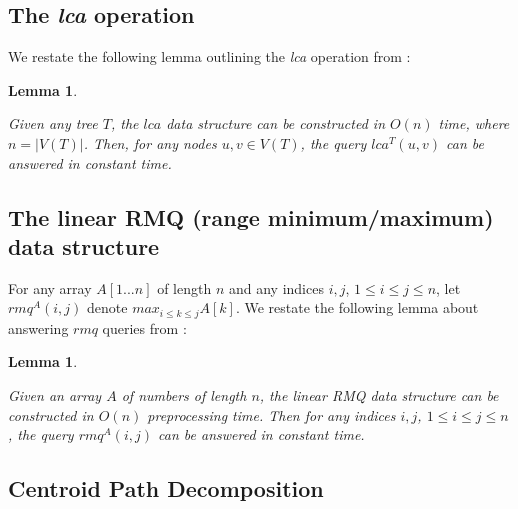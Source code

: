 \documentclass{article}
\newtheorem{lca}[incompatibility]{Lemma}
\newtheorem{linearrmq}[incompatibility]{Lemma}
\begin{document}
    \subsection{The \textit{lca} operation}

    We restate the following lemma outlining the \textit{lca} operation from \cite{bender2000lca}:
    \newline

    \begin{lca}
        \label{lem:lca}

        Given any tree $T$, the $lca$ data structure can be constructed in $O(n)$ time, where $n = |V(T)|$. Then, for any nodes $u, v \in V(T)$, the query $lca^{T}(u, v)$ can be answered in constant time.
    \end{lca}

    \subsection{The linear RMQ (range minimum/maximum) data structure}

    For any array $A[1 ... n]$ of length $n$ and any indices $i, j$, $1 \leq i \leq j \leq n$, let $rmq^A(i, j)$ denote $max_{i \leq k \leq j}A[k]$. We restate the following lemma about answering $rmq$ queries from \cite{bender2000lca}:
    \newline

    \begin{linearrmq}
        \label{lem:linearrmq}

        Given an array $A$ of numbers of length $n$, the \textit{linear RMQ data structure} can be constructed in $O(n)$ preprocessing time. Then for any indices $i, j$, $1 \leq i \leq j \leq n$, the query $rmq^A(i, j)$ can be answered in constant time.
    \end{linearrmq}

    \subsection{Centroid Path Decomposition}
\end{document}
